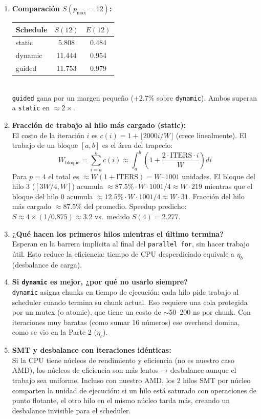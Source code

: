 \documentclass[12pt,letterpaper]{article}
\begin{document}
\begin{enumerate}

\item \textbf{Comparación $S(p_{\max}=12)$:}\\
\begin{tabular}{lcc}
\toprule
Schedule & $S(12)$ & $E(12)$ \\
\midrule
static  & 5.808 & 0.484 \\
dynamic & 11.444 & 0.954 \\
guided  & 11.753 & 0.979 \\
\bottomrule
\end{tabular}\\[4pt]
\texttt{guided} gana por un margen pequeño ($+2.7\%$ sobre \texttt{dynamic}). Ambos superan a \texttt{static} en $\approx 2\times$.

\item \textbf{Fracción de trabajo al hilo más cargado (static):}\\
El costo de la iteración $i$ es $c(i) = 1 + \lfloor 2000i/W \rfloor$ (crece linealmente). El trabajo de un bloque $[a,b]$ es el área del trapecio:
\[
W_{\text{bloque}} = \sum_{i=a}^{b} c(i) \approx \int_a^b \left(1 + \frac{2\cdot\text{ITERS}\cdot i}{W}\right)di
\]
Para $p = 4$ el total es $\approx W(1 + \text{ITERS}) = W \cdot 1001$ unidades. El bloque del hilo 3 ($[3W/4, W]$) acumula $\approx 87.5\%\cdot W\cdot 1001/4 \approx W\cdot 219$ mientras que el bloque del hilo 0 acumula $\approx 12.5\%\cdot W\cdot 1001/4 \approx W\cdot 31$. Fracción del hilo más cargado $\approx 87.5\%$ del promedio. Speedup predicho: $S \approx 4 \times (1/0.875) \approx 3.2$ vs.\ medido $S(4) = 2.277$.

\item \textbf{¿Qué hacen los primeros hilos mientras el último termina?}\\
Esperan en la barrera implícita al final del \texttt{parallel for}, sin hacer trabajo útil. Esto reduce la eficiencia: tiempo de CPU desperdiciado equivale a $\eta_b$ (desbalance de carga).

\item \textbf{Si \texttt{dynamic} es mejor, ¿por qué no usarlo siempre?}\\
\texttt{dynamic} asigna chunks en tiempo de ejecución: cada hilo pide trabajo al scheduler cuando termina su chunk actual. Eso requiere una cola protegida por un mutex (o atomic), que tiene un costo de $\sim$50–200 ns por chunk. Con iteraciones muy baratas (como sumar 16 números) ese overhead domina, como se vio en la Parte 2 ($\eta_c$).

\item \textbf{SMT y desbalance con iteraciones idénticas:}\\
Si la CPU tiene núcleos de rendimiento y eficiencia (no es nuestro caso AMD), los núcleos de eficiencia son más lentos → desbalance aunque el trabajo sea uniforme. Incluso con nuestro AMD, los 2 hilos SMT por núcleo comparten la unidad de ejecución: si un hilo está saturado con operaciones de punto flotante, el otro hilo en el mismo núcleo tarda más, creando un desbalance invisible para el scheduler.

\end{enumerate}
\end{document}
